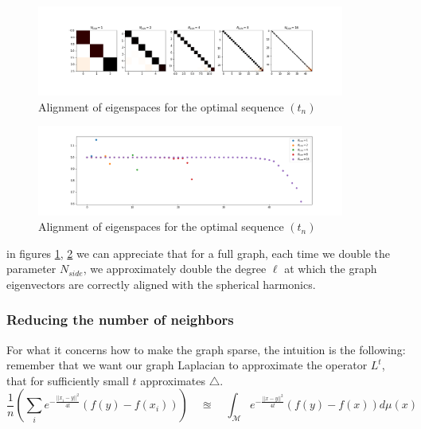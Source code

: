 \begin{figure}[h]
	\centering
	\includegraphics[width=0.9\textwidth]{../codes/02.HeatKernelGraphLaplacian/HEALPix/06_figures/optimal_full.png}	
\caption{\label{fig:optimal graph}Alignment of eigenspaces for the optimal sequence $(t_n)$}
\end{figure}
\begin{figure}[h]
	\centering
	\includegraphics[width=0.9\textwidth]{../codes/02.HeatKernelGraphLaplacian/HEALPix/06_figures/optimal_full_diagonal.png}
	\caption{\label{fig:optimal graph diagonal}Alignment of eigenspaces for the optimal sequence $(t_n)$}	
\end{figure}

in figures \ref{fig:optimal graph}, \ref{fig:optimal graph diagonal} we can appreciate that for a full graph, each time we double the parameter $N_{side}$, we approximately double the degree $\ell$ at which the graph eigenvectors are correctly aligned with the spherical harmonics.
\subsubsection{Reducing the number of neighbors}
For what it concerns how to make the graph sparse, the intuition is the following: remember that we want our graph Laplacian to approximate the operator $L^t$, that for sufficiently small $t$ approximates $\triangle$.
$$\frac{1}{n}\left(\sum_i e^{-\frac{||x_i-y||^2}{4t}}(f(y)-f(x_i)) \right) \quad \approxeq \quad \int_\mathcal M e^{-\frac{||x-y||^2}{4t}}\left(f(y)-f(x)\right)d\mu(x) $$

